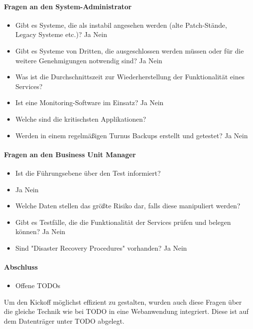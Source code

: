 \paragraph{Fragen an den System-Administrator}
\begin{itemize}
\item Gibt es Systeme, die als instabil angesehen werden (alte Patch-Stände, Legacy Systeme etc.)? Ja Nein
\item Gibt es Systeme von Dritten, die ausgeschlossen werden müssen oder für die weitere Genehmigungen notwendig sind? Ja Nein
\item Was ist die Durchschnittszeit zur Wiederherstellung der Funktionalität eines Services?
\item Ist eine Monitoring-Software im Einsatz? Ja Nein
\item Welche sind die kritischsten Applikationen?
\item Werden in einem regelmäßigen Turnus Backups erstellt und getestet? Ja Nein
\end{itemize}

\paragraph{Fragen an den Business Unit Manager}
\begin{itemize}
\item Ist die Führungsebene über den Test informiert?
\item Ja Nein
\item Welche Daten stellen das größte Risiko dar, falls diese manipuliert werden?
\item Gibt es Testfälle, die die Funktionalität der Services prüfen und belegen können? Ja Nein
\item Sind "Disaster Recovery Procedures" vorhanden? Ja Nein
\end{itemize}

\paragraph{Abschluss}
\begin{itemize}
\item Offene TODOs
\end{itemize}
	
		Um den Kickoff möglichst effizient zu gestalten, wurden auch diese Fragen über die gleiche Technik wie bei TODO in eine Webanwendung integriert. Diese ist auf dem Datenträger unter TODO abgelegt.
			
